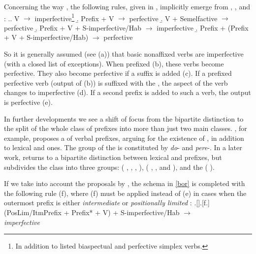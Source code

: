 Concerning the way , the following rules, given in \cite{Borer:13}, implicitly emerge from \citet{Ramchand:04}, \citet{Romanova:04}, and \citet{Svenonius:04b}:
\ex.\label{bor}\a. V $\rightarrow$ {imperfective}\footnote{In addition to listed biaspectual and perfective simplex verbs.}
\b. Prefix + V $\rightarrow$ {perfective}
\b. V + Semelfactive $\rightarrow$ {perfective}
\b. Prefix + V + S-imperfective/Hab $\rightarrow$ {imperfective}
\b. Prefix + (Prefix + V + S-imperfective/Hab) $\rightarrow$ {perfective}

So it is generally assumed (see (a)) that basic nonaffixed verbs are imperfective (with a closed list of exceptions). When prefixed (b), these verbs become perfective. They also become perfective if a  suffix is added (c). If a prefixed perfective verb (output of (b)) is suffixed with the , the aspect of the verb changes to imperfective (d). If a second prefix is added to such a verb, the output is perfective (e).

In further developments we see a shift of focus from the bipartite distinction to the split of the whole class of prefixes into more than just two main classes. \citet{Tatevosov:07}, for example, proposes a  of verbal prefixes, arguing for the existence of , in addition to lexical and  ones. The group of the  is constituted by  \textit{do}- and  \textit{pere}-. In a later work, \citet{Tatevosov:09} returns to a bipartite distinction between lexical and  prefixes, but subdivides the  class into three groups:  ( ,  ,  ,  ),  ( ,  , and  ), and the  ( ).

If we take into account the proposals by \citet{Tatevosov:07, Tatevosov:09}, the schema in \ref{bor} is completed with the following rule (f), where (f) must be applied instead of (e) in cases when the outermost prefix is either \textit{intermediate} \citep{Tatevosov:07} or \textit{positionally limited} \citep{Tatevosov:09}: 
\ex.[]\a.[f.] (PosLim/ItmPrefix + Prefix* + V) + S-imperfective/Hab $\rightarrow$\\ \textit{imperfective} 

